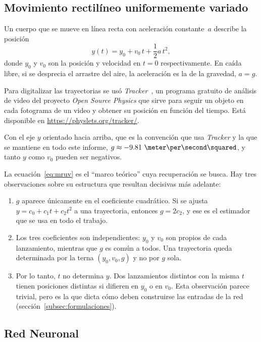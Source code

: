 \documentclass[titlepage,11pt]{article}
\providecommand{\num}[1]{\ensuremath{#1}}
\begin{document}
\subsection{Movimiento rectilíneo uniformemente variado}
\label{subsec:mru}

Un cuerpo que se mueve en línea recta con aceleración constante~$a$ describe
la posición
\begin{equation}
  y(t) = y_0 + v_0\,t + \frac{1}{2}a\,t^2,
  \label{eq:mruv}
\end{equation}
donde $y_0$ y $v_0$ son la posición y velocidad en $t=0$ respectivamente. En caída
libre, si se desprecia el arrastre del aire, la aceleración es la de la
gravedad, $a=g$.

Para digitalizar las trayectorias se usó \emph{Tracker}~\cite{tracker}, un
programa gratuito de análisis de video del proyecto \emph{Open Source Physics}
que sirve para seguir un objeto en cada fotograma de un video y obtener su
posición en función del tiempo. Está disponible en
\url{https://physlets.org/tracker/}.

Con el eje $y$ orientado hacia arriba, que es la convención
que usa \emph{Tracker} y la que se mantiene en todo este informe,
$g\approx\num{-9.81}~\meter\per\second\squared$, y tanto $y$ como $v_0$ pueden
ser negativos.

La ecuación~\eqref{eq:mruv} es el \enquote{marco teórico} cuya recuperación se
busca. Hay tres observaciones sobre su estructura que resultan decisivas más
adelante:

\begin{enumerate}
\item $g$ aparece únicamente en el coeficiente cuadrático. Si se ajusta
  $y=c_0+c_1t+c_2t^2$ a una trayectoria, entonces $g=2c_2$, y ese es el
  estimador que se usa en todo el trabajo.
\item Los tres coeficientes son independientes: $y_0$ y $v_0$ son propios de
  cada lanzamiento, mientras que $g$ es común a todos. Una trayectoria queda
  determinada por la terna $(y_0,v_0,g)$ y no por $g$ sola.
\item Por lo tanto, $t$ no determina $y$. Dos lanzamientos distintos con la
  misma $t$ tienen posiciones distintas si difieren en $y_0$ o en $v_0$. Esta
  observación parece trivial, pero es la que dicta cómo deben construirse las
  entradas de la red (sección~\ref{subsec:formulaciones}).
\end{enumerate}

\subsection{Red Neuronal}
\label{subsec:redneuronal}
\end{document}
